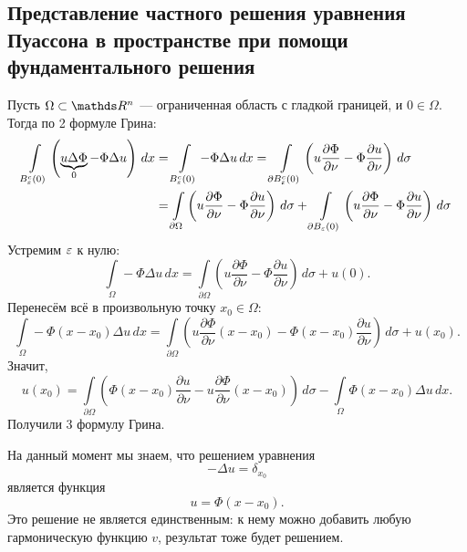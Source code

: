 \subsection{Представление частного решения уравнения Пуассона в пространстве при помощи фундаментального решения}

\begin{note}  Пусть $\Omega\subset\real^n$ --- ограниченная область с гладкой границей, и $0 \in \Omega$. Тогда по 2 формуле Грина:
\begin{align*}
\int \limits_{B^c_\varepsilon(0)} \left( \underbrace{u\Delta\Phi}_{0} - \Phi\Delta u \right) \, dx &= \int \limits_{B^c_\varepsilon(0)} - \Phi \Delta u \, dx = \int \limits_{\partial B^c_\varepsilon(0)} \left( u \dfrac{\partial\Phi}{\partial\nu} - \Phi\dfrac{\partial u}{\partial\nu} \right) \,d\sigma \\
&= \int \limits_{\partial \Omega} \left( u \dfrac{\partial\Phi}{\partial\nu} - \Phi\dfrac{\partial u}{\partial\nu} \right) \,d\sigma + \int\limits_{\partial B_\varepsilon(0)} \left( u \dfrac{\partial\Phi}{\partial\nu} - \Phi\dfrac{\partial u}{\partial\nu} \right) \,d\sigma
\end{align*}
Устремим $\varepsilon$ к нулю:
$$ \int \limits_\Omega - \Phi \Delta u \, dx = \int \limits_{\partial \Omega} \left( u \dfrac{\partial\Phi}{\partial\nu} - \Phi\dfrac{\partial u}{\partial\nu} \right) \,d\sigma + u(0).$$
Перенесём всё в произвольную точку $x_0\in\Omega$:
$$ \int \limits_\Omega - \Phi (x- x_0) \Delta u \, dx = \int \limits_{\partial \Omega} \left( u \dfrac{\partial\Phi}{\partial\nu} (x-x_0) - \Phi (x - x_0) \dfrac{\partial u}{\partial\nu} \right) \,d\sigma + u(x_0).$$
Значит,
$$ u(x_0) = \int \limits_{\partial \Omega} \left( \Phi (x - x_0) \dfrac{\partial u}{\partial\nu} - u \dfrac{\partial\Phi}{\partial\nu} (x-x_0) \right) \,d\sigma - \int \limits_\Omega \Phi (x- x_0) \Delta u \, dx.$$
Получили 3 формулу Грина.
\end{note}

На данный момент мы знаем, что решением уравнения
$$-\Delta u =\delta_{x_0}$$ является функция $$ u=\Phi(x-x_0).$$ Это решение не является единственным: к нему можно добавить любую гармоническую функцию $v$, результат тоже будет решением.

